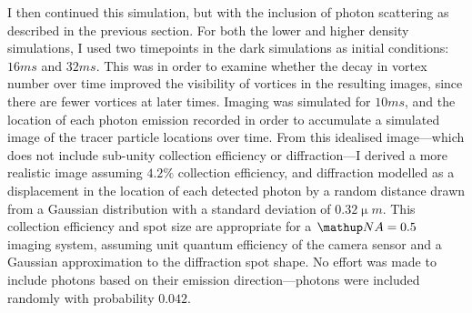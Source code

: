I then continued this simulation, but with the inclusion of photon scattering as described in the previous section. For both the lower and higher density simulations, I used two timepoints in the dark simulations as initial conditions: $16\unit{ms}$ and $32\unit{ms}$. This was in order to examine whether the decay in vortex number over time improved the visibility of vortices in the resulting images, since there are fewer vortices at later times. Imaging was simulated for $10\unit{ms}$, and the location of each photon emission recorded in order to accumulate a simulated image of the tracer particle locations over time. From this idealised image---which does not include sub-unity collection efficiency or diffraction---I derived a more realistic image assuming $4.2 \%$ collection efficiency, and diffraction modelled as a displacement in the location of each detected photon by a random distance drawn from a Gaussian distribution with a standard deviation of $0.32\unit{\upmu m}$. This collection efficiency and spot size are appropriate for a $\up{NA}=0.5$ imaging system, assuming unit quantum efficiency of the camera sensor and a Gaussian approximation to the diffraction spot shape. No effort was made to include photons based on their emission direction---photons were included randomly with probability $0.042$.



